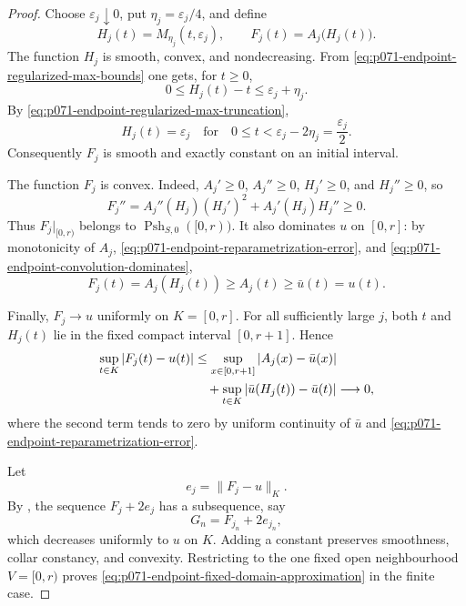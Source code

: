 \begin{proof}
Choose \(\varepsilon_j\downarrow0\), put
\(\eta_j=\varepsilon_j/4\), and define
\begin{equation}
 H_j(t)=M_{\eta_j}(t,\varepsilon_j),
 \qquad
 F_j(t)=A_j\bigl(H_j(t)\bigr).
 \label{eq:p071-endpoint-collar-approximants}
\end{equation}
The function \(H_j\) is smooth, convex, and nondecreasing.  From
\eqref{eq:p071-endpoint-regularized-max-bounds} one gets, for \(t\geq0\),
\begin{equation}
 0\leq H_j(t)-t\leq\varepsilon_j+\eta_j.
 \label{eq:p071-endpoint-reparametrization-error}
\end{equation}
By \eqref{eq:p071-endpoint-regularized-max-truncation},
\begin{equation}
 H_j(t)=\varepsilon_j
 \quad\text{for}\quad
 0\leq t<\varepsilon_j-2\eta_j
                =\frac{\varepsilon_j}{2}.
 \label{eq:p071-endpoint-exact-collar}
\end{equation}
Consequently \(F_j\) is smooth and exactly constant on an initial
interval.

The function \(F_j\) is convex.  Indeed, \(A_j'\geq0\),
\(A_j''\geq0\), \(H_j'\geq0\), and \(H_j''\geq0\), so
\[
 F_j''
  =A_j''(H_j)(H_j')^2+A_j'(H_j)H_j''
  \geq0.
\]
Thus \(F_j|_{[0,r)}\) belongs to
\(\operatorname{Psh}_{S,0}([0,r))\).  It also dominates \(u\) on
\([0,r]\): by monotonicity of \(A_j\),
\eqref{eq:p071-endpoint-reparametrization-error}, and
\eqref{eq:p071-endpoint-convolution-dominates},
\begin{equation}
 F_j(t)=A_j(H_j(t))
 \geq A_j(t)
 \geq\bar u(t)=u(t).
 \label{eq:p071-endpoint-smooth-domination}
\end{equation}

Finally, \(F_j\to u\) uniformly on \(K=[0,r]\).  For all sufficiently
large \(j\), both \(t\) and \(H_j(t)\) lie in the fixed compact interval
\([0,r+1]\).  Hence
\begin{align}
 \sup_{t\in K}|F_j(t)-u(t)|
 &\leq
 \sup_{x\in[0,r+1]}|A_j(x)-\bar u(x)|
 \notag\\
 &\quad+
 \sup_{t\in K}|\bar u(H_j(t))-\bar u(t)|
 \longrightarrow0,
 \label{eq:p071-endpoint-uniform-convergence}
\end{align}
where the second term tends to zero by uniform continuity of \(\bar u\)
and \eqref{eq:p071-endpoint-reparametrization-error}.

Let
\[
                       e_j=\lVert F_j-u\rVert_K.
\]
By \cite[Lemma~8.1.10]{CLD25}, the sequence \(F_j+2e_j\) has a
subsequence, say
\[
                         G_n=F_{j_n}+2e_{j_n},
\]
which decreases uniformly to \(u\) on \(K\).  Adding a constant preserves
smoothness, collar constancy, and convexity.  Restricting to the one fixed
open neighbourhood \(V=[0,r)\) proves
\eqref{eq:p071-endpoint-fixed-domain-approximation} in the finite case.


\end{proof}
